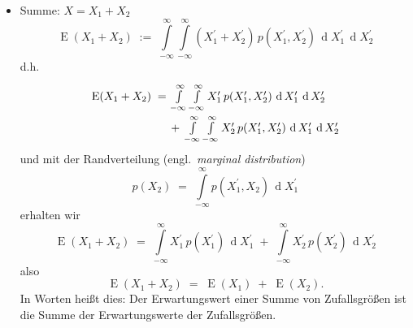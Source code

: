 \begin{itemize}
\item Summe: $X = X_1 + X_2$
\begin{equation}
\operatorname{E}(X_1 + X_2) \; := \;  \int\limits_{-\infty}^{\infty} \int\limits_{-\infty}^{\infty}
(X_1^\prime + X_2^\prime) \, p(X_1^\prime, X_2^\prime) \, \operatorname{d} X_1^\prime \, \operatorname{d} X_2^\prime
\end{equation}
d.h.
\begin{equation}
\arraycolsep=2.0pt\def\arraystretch{2.0}
\begin{array}{ll}
\operatorname{E}(X_1 + X_2) \; = & \int\limits_{-\infty}^{\infty} \int\limits_{-\infty}^{\infty}
X_1^\prime \, p(X_1^\prime, X_2^\prime) \,
\operatorname{d} X_1^\prime \, \operatorname{d} X_2^\prime\\
& + \; \int\limits_{-\infty}^{\infty} \int\limits_{-\infty}^{\infty}
X_2^\prime \, p(X_1^\prime, X_2^\prime) \, \operatorname{d} X_1^\prime \, \operatorname{d} X_2^\prime
\end{array}
\end{equation}
und mit der Randverteilung (engl.\ \textsl{marginal distribution})
\begin{equation}
p(X_2) \; = \;
\int\limits_{-\infty}^{\infty} p(X_1^\prime, X_2) \, \operatorname{d} X_1^\prime
\label{marginalDistr}
\end{equation}
erhalten wir
\begin{equation}
\operatorname{E}(X_1 + X_2) \; = \; \int\limits_{-\infty}^{\infty}
X_1^\prime \, p(X_1^\prime) \, \operatorname{d} X_1^\prime
\; + \; \int\limits_{-\infty}^{\infty}
X_2^\prime \, p(X_2^\prime) \, \operatorname{d} X_2^\prime
\end{equation}
also
\begin{equation}
\operatorname{E}(X_1 + X_2) \; = \; \operatorname{E}(X_1) \; + \; \operatorname{E}(X_2).
\label{EwSummeISTSummeEw}
\end{equation}
In Worten heißt dies: Der Erwartungswert einer Summe von Zufallsgrößen ist die
Summe der Erwartungswerte der Zufallsgrößen.


\end{itemize}
